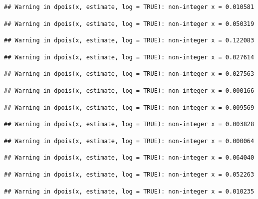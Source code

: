 \documentclass[]{article}
\begin{document}
\begin{verbatim}
## Warning in dpois(x, estimate, log = TRUE): non-integer x = 0.010581
\end{verbatim}

\begin{verbatim}
## Warning in dpois(x, estimate, log = TRUE): non-integer x = 0.050319
\end{verbatim}

\begin{verbatim}
## Warning in dpois(x, estimate, log = TRUE): non-integer x = 0.122083
\end{verbatim}

\begin{verbatim}
## Warning in dpois(x, estimate, log = TRUE): non-integer x = 0.027614
\end{verbatim}

\begin{verbatim}
## Warning in dpois(x, estimate, log = TRUE): non-integer x = 0.027563
\end{verbatim}

\begin{verbatim}
## Warning in dpois(x, estimate, log = TRUE): non-integer x = 0.000166
\end{verbatim}

\begin{verbatim}
## Warning in dpois(x, estimate, log = TRUE): non-integer x = 0.009569
\end{verbatim}

\begin{verbatim}
## Warning in dpois(x, estimate, log = TRUE): non-integer x = 0.003828
\end{verbatim}

\begin{verbatim}
## Warning in dpois(x, estimate, log = TRUE): non-integer x = 0.000064
\end{verbatim}

\begin{verbatim}
## Warning in dpois(x, estimate, log = TRUE): non-integer x = 0.064040
\end{verbatim}

\begin{verbatim}
## Warning in dpois(x, estimate, log = TRUE): non-integer x = 0.052263
\end{verbatim}

\begin{verbatim}
## Warning in dpois(x, estimate, log = TRUE): non-integer x = 0.010235
\end{verbatim}
\end{document}
